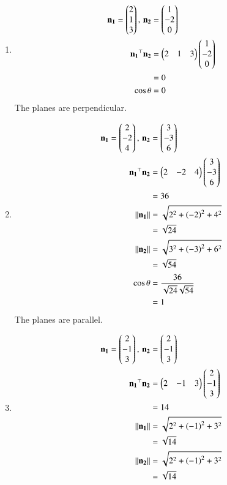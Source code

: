 \documentclass[journal,12pt,twocolumn]{IEEEtran}
\begin{document}
\begin{enumerate}
\begin{enumerate}
\item
\begin{align}
\mathbf{n_1} = \begin{pmatrix}2\\1\\3\end{pmatrix},\, \mathbf{n_2} &= \begin{pmatrix}1\\-2\\0\end{pmatrix}\\
\mathbf{n_1}^{\top}\mathbf{n_2} &= \begin{pmatrix}2&1&3\end{pmatrix}\begin{pmatrix}1\\-2\\0\end{pmatrix}\\
&= 0\\
\cos{\theta} &= 0
\end{align}  
The planes are perpendicular.
\item
\begin{align}
\mathbf{n_1} = \begin{pmatrix}2\\-2\\4\end{pmatrix},\, \mathbf{n_2} &= \begin{pmatrix}3\\-3\\6\end{pmatrix}\\
\mathbf{n_1}^{\top}\mathbf{n_2} &= \begin{pmatrix}2&-2&4\end{pmatrix}\begin{pmatrix}3\\-3\\6\end{pmatrix}\\
&= 36\\
\left\lVert\mathbf{n_1}\right\rVert &= \sqrt{2^2+\left(-2\right)^2+4^2}\\ 
&= \sqrt{24}\\
\left\lVert\mathbf{n_2}\right\rVert &= \sqrt{3^2+\left(-3\right)^2+6^2} \\
&= \sqrt{54}\\
\cos{\theta}&= \frac{36}{\sqrt{24}\sqrt{54}}\\
&= 1
\end{align}
The planes are parallel.
\item
\begin{align}
\vec{n_1} = \myvec{2\\-1\\3}, \, \vec{n_2} &= \myvec{2\\-1\\3}\\
\vec{n_1}^{\top}\vec{n_2} &= \myvec{2&-1&3}\myvec{2\\-1\\3}\\
&= 14\\
\norm{\vec{n_1}} &= \sqrt{2^2+\brak{-1}^2+3^2}\\ 
&= \sqrt{14}\\
\norm{\vec{n_2}} &= \sqrt{2^2+\brak{-1}^2+3^2}\\
&= \sqrt{14}\\

\end{align}
\end{enumerate}
\end{enumerate}
\end{document}
